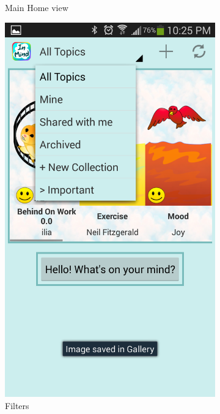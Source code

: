 \begin{figure}
\begin{subfigure}[b]{0.3\textwidth}
         \caption{Main Home view}
      \end{subfigure}
      \begin{subfigure}[b]{0.3\textwidth}
        \includegraphics[width=\textwidth]{home_nav.png}
        \caption{Filters}
      \end{subfigure}
      \begin{subfigure}[b]{0.3\textwidth}

\end{subfigure}
\end{figure}
